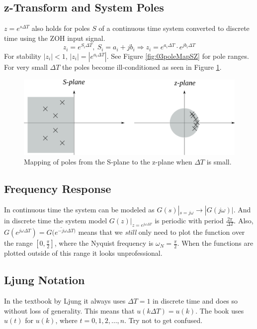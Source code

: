 \documentclass[lecture,12pt,]{pcms-l}
\theoremstyle{example}
\newcommand{\w}{\omega}
\newcommand{\dt}{\Delta T}
\begin{document}
\subsection{z-Transform and System Poles}
$z=e^{s\dt}$ also holds for poles $S$ of a continuous time system converted to discrete time using the ZOH input signal.
$$z_i=e^{S_i\dt}, ~ S_i = a_i+jb_i \Rightarrow z_i = e^{a_i\dt} \cdot e^{jb_i\dt}$$
For stability $|z_i|<1$, $|z_i|=\left| e^{a_i\dt}\right|$. See Figure \ref{fig:03poleMapSZ} for pole ranges. For very small $\dt$ the poles become ill-conditioned as seen in Figure \ref{fig:03poleMapSZsmallT}.
\begin{figure}[ht!]
	\centering
	\includegraphics[width=.6\textwidth]{images/03poleMapSZsmallT}
	\caption{Mapping of poles from the S-plane to the z-plane when $\dt$ is small.}
	\label{fig:03poleMapSZsmallT}
\end{figure}

\subsection{Frequency Response}
In continuous time the system can be modeled as $G(s)|_{s=j\w}\to|G(j\w)|$. And in discrete time the system model $G(z)|_{z=e^{j\w\dt}}$ is periodic with period $\frac{2\pi}{\dt}$. Also, $G(e^{j\w\dt}) = \overline{G(e^{-j\w\dt)}}$ means that we  \textit{still} only need to plot the function over the range $[0, \frac{\pi}{2}]$, where the Nyquist frequency is $\w_N=\frac{\pi}{2}$. When the functions are plotted outside of this range it looks unprofessional.

\subsection{Ljung Notation}
In the textbook by Ljung it always uses $\dt=1$ in discrete time and does so without loss of generality. This means that $u(k\dt) = u(k)$. The book uses $u(t)$ for $u(k)$, where $t=0,1,2,\ldots,n$. Try not to get confused.
\end{document}
